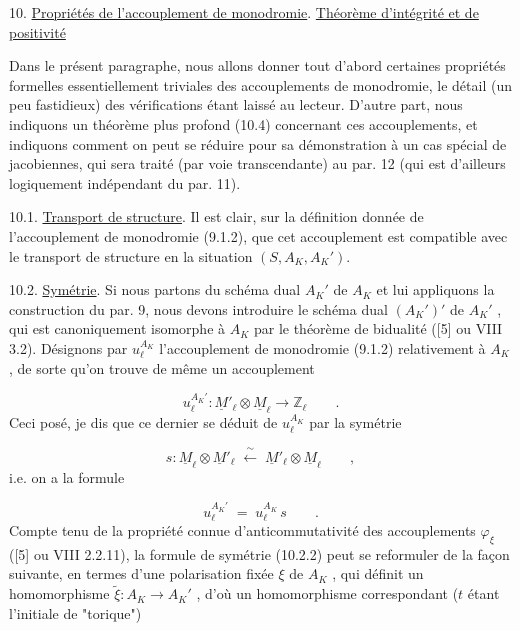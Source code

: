 

10. \underline{Propriétés de l'accouplement de monodromie}. \underline{Théorème d'intégrité et de positivité}

Dans le présent paragraphe, nous allons donner tout d'abord certaines propriétés formelles essentiellement triviales des accouplements de monodromie, le détail (un peu fastidieux) des vérifications étant laissé au lecteur. D'autre part, nous indiquons un théorème plus profond (10.4) concernant ces accouplements, et indiquons comment on peut se réduire pour sa démonstration à un cas spécial de jacobiennes, qui sera traité (par voie transcendante) au par. 12 (qui est d'ailleurs logiquement indépendant du par. 11).

10.1. \underline{Transport de structure}. Il est clair, sur la définition donnée de l'accouplement de monodromie (9.1.2), que cet accouplement est compatible avec le transport de structure en la situation $(S,A_K,A_K')$.

10.2. \underline{Symétrie}. Si nous partons du schéma dual $A_K'$ de $A_K$ et lui appliquons la construction du par. 9, nous devons introduire le schéma dual $(A_K')'$ de $A_K'$ , qui est canoniquement isomorphe à $A_K$ par le théorème de bidualité ([5] ou VIII 3.2). Désignons par $u_\ell^{A_K}$ l'accouplement de monodromie (9.1.2) relativement à $A_K$ , de sorte qu'on trouve de même un accouplement

\begin{equation}\tag{10.2.1}
u_\ell^{A_K'} : \underline{M}'_\ell \otimes \underline{M}_\ell \longrightarrow \mathbb{Z}_\ell \qquad .
\end{equation}
Ceci posé, je dis que ce dernier se déduit de $u_\ell^{A_K}$ par la symétrie

\begin{equation*}
s : \underline{M}_\ell \otimes \underline{M}'_\ell \;\xleftarrow{\;\sim\;}\; \underline{M}'_\ell \otimes \underline{M}_\ell \qquad ,
\end{equation*}
i.e. on a la formule



\begin{equation}\tag{10.2.2}
u_\ell^{A_K'} \;=\; u_\ell^{A_K}\, s \qquad .
\end{equation}
Compte tenu de la propriété connue d'anticommutativité des accouplements $\varphi_\xi$ ([5] ou VIII 2.2.11), la formule de symétrie (10.2.2) peut se reformuler de la façon suivante, en termes d'une polarisation fixée $\xi$ de $A_K$ , qui définit un homomorphisme $\widetilde{\xi} : A_K \longrightarrow A_K'$ , d'où un homomorphisme correspondant ($t$ étant l'initiale de "torique")

